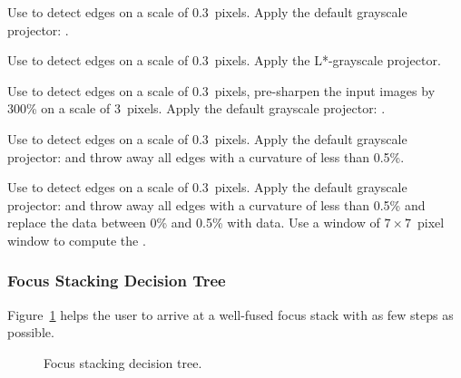 \noindent{}

\begin{codelist}
\item[\option{--contrast-edge-scale=0.3}]\itemend Use  to
  detect edges on a scale of 0.3~pixels.  Apply the default grayscale
  projector: .

\item[\itempar{\option{--contrast-edge-scale=0.3}
    \option{--gray-projector=l-star}}]\itemend Use  to
  detect edges on a scale of 0.3~pixels.  Apply the L*-grayscale
  projector.

\item[\option{--contrast-edge-scale=0.3:3:300\%}]\itemend Use
   to detect edges on a scale of 0.3~pixels, pre-sharpen
  the input images by 300\% on a scale of 3~pixels.  Apply the default
  grayscale projector: .

\item[\itempar{\option{--contrast-edge-scale=0.3}
    \mbox{\option{--contrast-min-curvature=-0.5\%}}}]\itemend Use
   to detect edges on a scale of 0.3~pixels.  Apply the
  default grayscale projector:  and throw away all edges
  with a curvature of less than 0.5\%.

\item[\itempar{\mbox{\option{--contrast-edge-scale=0.3}}
    \mbox{\option{--contrast-min-curvature=0.5\%}}
    \mbox{\option{--contrast-window-size=7}}}]\itemend Use  to
  detect edges on a scale of 0.3~pixels.  Apply the default grayscale
  projector:  and throw away all edges with a curvature
  of less than 0.5\% and replace the  data between 0\%
  and 0.5\% with  data.  Use a window of $7 \times
  7$~pixel window to compute the .
\end{codelist}


\subsubsection[Focus Stacking Decision Tree]{Focus Stacking Decision Tree
  \label{sec:focus-stacking-decision-tree}
  }

Figure~\ref{fig:focus-stacking-decision-tree} helps the user to arrive
at a well-fused focus stack with as few steps as possible.

\begin{figure}[htbp]
  \begin{maxipage}
  \end{maxipage}

  \caption{Focus stacking decision
    tree.\label{fig:focus-stacking-decision-tree}}
\end{figure}

